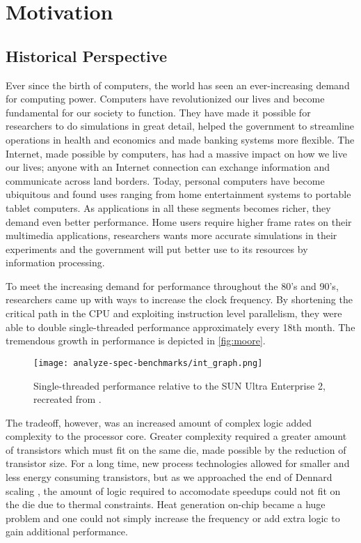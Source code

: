 \section{Motivation}

\subsection{Historical Perspective}

Ever since the birth of computers, the world has seen an ever-increasing demand
for computing power. Computers have revolutionized our lives and become
fundamental for our society to function. They have made it possible for
researchers to do simulations in great detail, helped the government to
streamline operations in health and economics and made banking systems more
flexible. The Internet, made possible by computers, has had a massive impact on
how we live our lives; anyone with an Internet connection can exchange
information and communicate across land borders. Today, personal computers have
become ubiquitous and found uses ranging from home entertainment systems to
portable tablet computers. As applications in all these segments becomes richer,
they demand even better performance. Home users require higher frame rates on
their multimedia applications, researchers wants more accurate simulations in
their experiments and the government will put better use to its resources by
information processing.

To meet the increasing demand for performance throughout the 80's and 90's,
researchers came up with ways to increase the clock frequency. By shortening the
critical path in the CPU and exploiting instruction level parallelism, they were
able to double single-threaded performance approximately every 18th month. The
tremendous growth in performance is depicted in \autoref{fig:moore}.

\begin{figure}
\texttt{[image: analyze-spec-benchmarks/int\_graph.png]}
\caption{Single-threaded performance relative to the SUN Ultra Enterprise 2,
recreated from \cite{preshing}.}
\label{fig:moore}
\end{figure}

The tradeoff, however, was an increased amount of complex logic added complexity
to the processor core. Greater complexity required a greater amount of
transistors which must fit on the same die, made possible by the reduction of
transistor size. For a long time, new process technologies allowed for smaller
and less energy consuming transistors, but as we approached the end of Dennard
scaling \cite{dennard}, the amount of logic required to accomodate speedups
could not fit on the die due to thermal constraints. Heat generation on-chip
became a huge problem and one could not simply increase the frequency or add
extra logic to gain additional performance.


